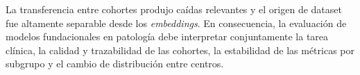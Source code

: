 La transferencia entre cohortes produjo caídas relevantes y el origen de dataset fue altamente separable desde los \textit{embeddings}. En consecuencia, la evaluación de modelos fundacionales en patología debe interpretar conjuntamente la tarea clínica, la calidad y trazabilidad de las cohortes, la estabilidad de las métricas por subgrupo y el cambio de distribución entre centros.